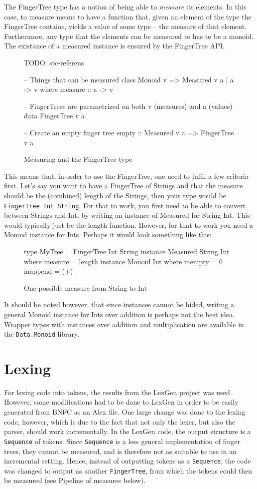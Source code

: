\documentclass[a4paper,12pt,twosided]{report}
\begin{document}
The FingerTree type has a notion of being able to \textit{measure} its elements.
In this case, to measure means to have a function that, given an element of the
type the FingerTree contains, yields a value of some type -- the measure of that
element. Furthermore, any type that the elements can be measured to has to be a
monoid. The existance of a measured instance is ensured by the FingerTree API. 
\begin{figure}[H]
TODO: src-referens
\begin{code}
-- Things that can be measured
class Monoid v => Measured v a | a -> v where
    measure :: a -> v

-- FingerTrees are parametrized on both v (measures) and a (values)
data FingerTree v a

-- Create an empty finger tree
empty :: Measured v a => FingerTree v a
\end{code}
\caption{Measuring and the FingerTree type}
\end{figure}
This means that, in order to use the FingerTree, one need to fulfil a few
criteria first. Let's say you want to have a FingerTree of Strings and that the
measure should be the (combined) length of the Strings, then your type would be
\texttt{FingerTree Int String}. For that to work, you first need to be able to
convert between Strings and Int, by writing an instance of Measured for String
Int. This would typically just be the length function. However, for that to work
you need a Monoid instance for Ints. Perhaps it would look something like this:

\begin{figure}[H]
\begin{code}
type MyTree = FingerTree Int String
instance Measured String Int where
    measure = length
instance Monoid Int where
    mempty = 0
    mappend = (+)
\end{code}
\caption{One possible measure from String to Int}
\end{figure}

It should be noted however, that since instances cannot be hided, writing a
general Monoid instance for Ints over addition is perhaps not the best idea.
Wrapper types with instances over addition and multiplication are available in
the \texttt{Data.Monoid} library.

\section{Lexing}
For lexing code into tokens, the results from the LexGen project was used.
However, some modifications had to be done to LexGen in order to be easily
generated from BNFC as an Alex file. One large change was done to the lexing
code, however, which is due to the fact that not only the lexer, but also the
parser, should work incrementally. In the LexGen code, the output structure is a
\texttt{Sequence} of tokens. Since \texttt{Sequence} is a less general
implementation of finger trees, they cannot be measured, and is therefore not as
suitable to use in an incremental setting. Hence, instead of outputting tokens
as a \texttt{Sequence}, the code was changed to output as another
\texttt{FingerTree}, from which the tokens could then be measured (see Pipeline
of measures below).
\end{document}

